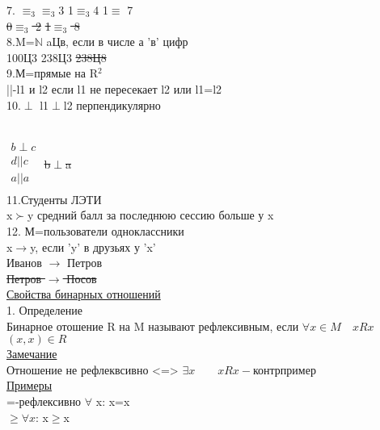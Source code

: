 \documentclass{article}
\begin{document}
7. $\equiv_3$$\equiv_3$3 1$\equiv_3$4 1$\equiv$ 7\\
\sout{0$\equiv_3$ 2} \sout{1$\equiv_3$ 8}\\
8.M=$\mathbb N$ \qquad aЦв, если в числе а 'в' цифр\\
100Ц3 238Ц3 \sout{238Ц8}\\
9.М=прямые на R$^2$\\
||-l1 и l2 если l1 не пересекает l2 или l1=l2\\
10.$\perp$ l1$\perp$l2 перпендикулярно \\
\\
$
\left.
\begin{array}{rcll}
b\perp c\\
 d||c\\
 a||a\\
\end{array}
\right.
$
\sout{b$\perp$a} \\
11.Студенты ЛЭТИ\\
x$\succ$y средний балл за последнюю сессию больше у x\\
12. М=пользователи одноклассники\\
x$\rightarrow$y, если 'y' в друзьях у 'x'\\
Иванов $\rightarrow$ Петров\\
\sout{Петров $\rightarrow$ Посов}\\
\underline{Свойства бинарных отношений}\\
1. Определение\\
Бинарное отошение R на M называют рефлексивным, если $\forall x\in M \quad xRx$\\
$(x,x)\in R$\\
\underline{Замечание}\\
Отношение не рефлеквсивно <=> $\exists x \qquad xRx-$контрпример\\
\underline{Примеры}\\
=-рефлексивно $\forall$ x: x=x\\
$\geq$\qquad $\forall x$: x$\geq$x\\
\end{document}
